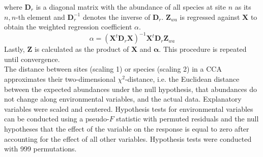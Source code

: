 \documentclass[a4paper,11pt]{article}
\begin{document}
		where $\mathbf{D}_r$ is a diagonal matrix with the abundance of all species at site $n$ as its $n,n$-th element and $\mathbf{D}_r^{-1}$ denotes the inverse of $\mathbf{D}_r$. 
		$\mathbf{Z}_{wa}$ is regressed against $\mathbf{X}$ to obtain the weighted regression coefficient $\alpha$. 
		\begin{equation}\label{CCA_canocical_weights}
		\alpha = (\mathbf{X}^t \mathbf{D}_r \mathbf{X})^{-1} \mathbf{X}^t \mathbf{D}_r \mathbf{Z}_{wa}
		\end{equation}
		Lastly, $\mathbf{Z}$ is calculated as the product of $\mathbf{X}$ and $\mathbf{\alpha}$. 
		This procedure is repeated until convergence. \\
		The distance between sites (scaling 1) or species (scaling 2) in a CCA approximates their two-dimensional $\chi^{2}$-distance, i.e. the Euclidean distance between the expected abundances under the null hypothesis, that abundances do not change along environmental variables, and the actual data.
		Explanatory variables were scaled and centered. 
		Hypothesis tests for environmental variables can be conducted using a pseudo-$F$ statistic with permuted residuals  \citep{Legendre2011} and the null hypotheses that the effect of the variable on the response is equal to zero after accounting for the effect of all other variables. 
	    Hypothesis tests were conducted with 999 permutations.\\
	
\end{document}
